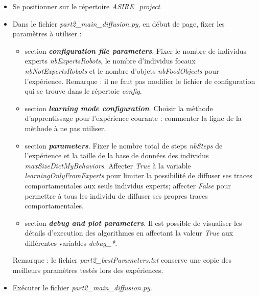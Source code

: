 \documentclass[a4paper, 12pt]{report}
\begin{document}
    \begin{itemize}
        \item Se positionner sur le répertoire \textit{ASIRE\_project}
        
        \item Dans le fichier \textit{part2\_main\_diffusion.py}, en début de page, fixer les paramètres à utiliser :
        
        \begin{itemize}
        \item section \textbf{\textit{configuration file parameters}}. Fixer le nombre de individus experts \textit{nbExpertsRobots}, le nombre d'individus focaux \textit{nbNotExpertsRobots} et le nombre d'objets \textit{nbFoodObjects} pour l'expérience. Remarque : il ne faut pas modifier le fichier de configuration qui se trouve dans le répertoie \textit{config}.
        \item section \textbf{\textit{learning mode configuration}}. Choisir la mèthode d'apprentissage pour l'expérience courante : commenter la ligne de la mèthode à ne pas utiliser.
      \item section \textbf{\textit{parameters}}. Fixer le nombre total de steps \textit{nbSteps} de l'expérience et la taille de la base de données des individus \textit{maxSizeDictMyBehaviors}. Affecter \textit{True} à la variable \textit{learningOnlyFromExperts} pour limiter la possibilité de diffuser ses traces comportamentales aux seuls individus experts; affecter \textit{False} pour permettre à tous les individu de diffuser ses propres traces comportamentales.
            \item section \textbf{\textit{debug and plot parameters}}. Il est possible de visualiser les détails d'execution des algorithmes en affectant la valeur \textit{True} aux différentes variables \textit{debug\_*}.
            
        \end{itemize}
        
        Remarque : le fichier \textit{part2\_bestParameters.txt} conserve une copie des meilleurs paramètres testés lors des expériences.
        
        \item Exécuter le fichier \textit{part2\_main\_diffusion.py}.
    
    \end{itemize}
\end{document}
